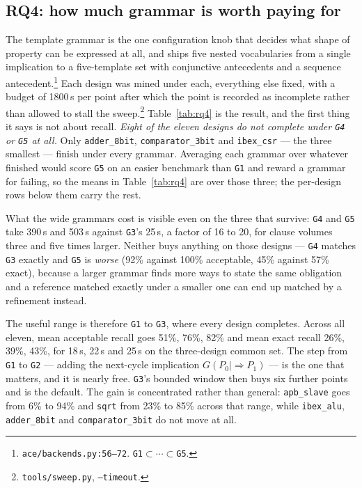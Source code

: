 \subsection{RQ4: how much grammar is worth paying for}
\label{sec:rq4}
The template grammar is the one configuration knob that decides what shape of property can be
expressed at all, and \ACE{} ships five nested vocabularies \Grammar{} from a single
implication to a five-template set with conjunctive antecedents and a sequence
antecedent.\footnote{\texttt{ace/backends.py:56--72}. \texttt{G1}$\subset\cdots\subset$\texttt{G5}.}
Each design was mined under each, everything else fixed, with a budget of 1800\,s per point
after which the point is recorded as incomplete rather than allowed to stall the
sweep.\footnote{\texttt{tools/sweep.py}, \texttt{--timeout}.} Table~\ref{tab:rq4} is the
result, and the first thing it says is not about recall. \emph{Eight of the eleven designs do
not complete under \texttt{G4} or \texttt{G5} at all.} Only \texttt{adder\_8bit},
\texttt{comparator\_3bit} and \texttt{ibex\_csr} --- the three smallest --- finish under every
grammar. Averaging each grammar over whatever finished would score \texttt{G5} on an easier
benchmark than \texttt{G1} and reward a grammar for failing, so the means in
Table~\ref{tab:rq4} are over those three; the per-design rows below them carry the rest.

What the wide grammars cost is visible even on the three that survive: \texttt{G4} and
\texttt{G5} take 390\,s and 503\,s against \texttt{G3}'s 25\,s, a factor of 16 to 20, for
clause volumes three and five times larger. Neither buys anything on those designs ---
\texttt{G4} matches \texttt{G3} exactly and \texttt{G5} is \emph{worse} (92\% against 100\%
acceptable, 45\% against 57\% exact), because a larger grammar finds more ways to state the
same obligation and a reference matched exactly under a smaller one can end up matched by a
refinement instead.

The useful range is therefore \texttt{G1} to \texttt{G3}, where every design completes.
Across all eleven, mean acceptable recall goes 51\%, 76\%, 82\% and mean exact recall 26\%,
39\%, 43\%, for 18\,s, 22\,s and 25\,s on the three-design common set. The step from
\texttt{G1} to \texttt{G2} --- adding the next-cycle implication $G(P_0\mid\Rightarrow P_1)$
--- is the one that matters, and it is nearly free. \texttt{G3}'s bounded window then buys six
further points and is the default. The gain is concentrated rather than general:
\texttt{apb\_slave} goes from 6\% to 94\% and \texttt{sqrt} from 23\% to 85\% across that
range, while \texttt{ibex\_alu}, \texttt{adder\_8bit} and \texttt{comparator\_3bit} do not
move at all.

